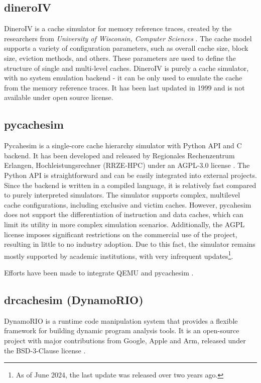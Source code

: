 \subsection{dineroIV}

DineroIV is a cache simulator for memory reference traces, created by the researchers from \textit{University of Wisconsin, Computer Sciences} \cite{dinero}. 
The cache model supports a variety of configuration parameters, such as overall cache size, block size, eviction methods, and others. These parameters are used to define the structure of
single and multi-level caches. DineroIV is purely a cache simulator, with no system emulation backend - it can be only used to emulate the cache from the memory reference traces.
It has been last updated in 1999 and is not available under open source license.

\subsection{pycachesim}

Pycahesim is a single-core cache hierarchy simulator with Python API and C backend. It has been developed and released by Regionales Rechenzentrum Erlangen, Hochleistungsrechner (RRZE-HPC)
under an AGPL-3.0 license \cite{pycachesim}. The Python API is straightforward and can be easily integrated into external projects. Since the backend is written in a compiled language, it is
relatively fast compared to purely interpreted simulators. The simulator supports complex, multilevel cache configurations, including exclusive and victim caches.
However, pycahesim does not support the differentiation of instruction and data caches, which can limit its utility in more complex simulation scenarios. Additionally, the AGPL
license imposes significant restrictions on the commercial use of the project, resulting in little to no industry adoption. Due to this fact, the simulator remains mostly supported
by academic institutions, with very infrequent updates\footnote{As of June 2024, the last update was released over two years ago.}.

\vspace{10px}
\noindent Efforts have been made to integrate QEMU and pycachesim \cite{pycachesimqemu}.

\subsection{drcachesim (DynamoRIO)}

DynamoRIO is a runtime code manipulation system that provides a flexible framework for building dynamic program analysis tools. It is an open-source project with major
contributions from Google, Apple and Arm, released under the BSD-3-Clause license \cite{dynamorio}.

